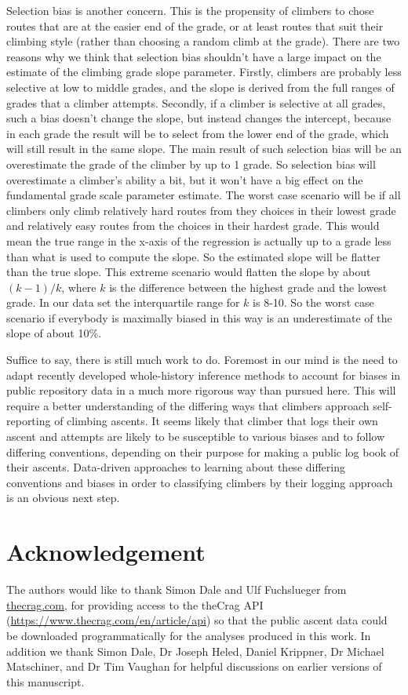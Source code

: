 \documentclass{article}
\begin{document}
Selection bias is another concern. This is the propensity of climbers to chose routes that are at the easier end of the grade, or at least routes that suit their climbing style (rather than choosing a random climb at the grade). There are two reasons why we think that selection bias shouldn't have a large impact on the estimate of the climbing grade slope parameter. Firstly, climbers are probably less selective at low to middle grades, and the slope is derived from the full ranges of grades that a climber attempts. Secondly, if a climber is selective at all grades, such a bias doesn't change the slope, but instead changes the intercept, because in each grade the result will be to select from the lower end of the grade, which will still result in the same slope. The main result of such selection bias will be an overestimate the grade of the climber by up to 1 grade. So selection bias will overestimate a climber's ability a bit, but it won't have a big effect on the fundamental grade scale parameter estimate. The worst case scenario will be if all climbers only climb relatively hard routes from they choices in their lowest grade and relatively easy routes from the choices in their hardest grade. This would mean the true range in the x-axis of the regression is actually up to a grade less than what is used to compute the slope. So the estimated slope will be flatter than the true slope. This extreme scenario would flatten the slope by about $(k-1)/k$, where $k$ is the difference between the highest grade and the lowest grade. In our data set the interquartile range for $k$ is 8-10. So the worst case scenario if everybody is maximally biased in this way is an underestimate of the slope of about 10\%.  

Suffice to say, there is still much work to do. Foremost in our mind is the need to adapt recently developed whole-history inference methods to account for biases in public repository data in a much more rigorous way than pursued here. This will require a better understanding of the differing ways that climbers approach self-reporting of climbing ascents. It seems likely that climber that logs their own ascent and attempts are likely to be susceptible to various biases and to follow differing conventions, depending on their purpose for making a public log book of their ascents. Data-driven approaches to learning about these differing conventions and biases in order to classifying climbers by their logging approach is an obvious next step.

\section*{Acknowledgement}

The authors would like to thank Simon Dale and Ulf Fuchslueger from \url{thecrag.com}, for providing access to the theCrag API (\url{https://www.thecrag.com/en/article/api}) so that the public ascent data could be downloaded programmatically for the analyses produced in this work. In addition we thank Simon Dale, Dr Joseph Heled, Daniel Krippner, Dr Michael Matschiner, and Dr Tim Vaughan for helpful discussions on earlier versions of this manuscript.

\printglossaries



\end{document}
